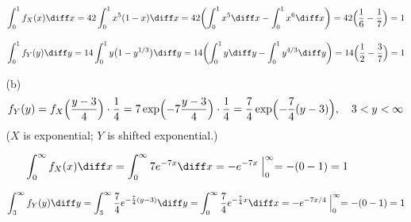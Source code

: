 \documentclass[12pt]{article}
\begin{document}
\begin{enumerate}
\begin{enumerate}
\[
\int_0^1 f_X(x)\diff x
= 42\int_0^1 x^5(1-x) \diff x
= 42\biggl(\int_0^1 x^5\diff x - \int_0^1 x^6\diff x\biggr)
= 42\Bigl(\frac{1}{6} - \frac{1}{7}\Bigr)
= 1
\]

\[
\int_0^1 f_Y(y) \diff y
= 14 \int_0^1 y\bigl(1 - y^{1/3}\bigr) \diff y
= 14\biggl(\int_0^1 y\diff y - \int_0^1 y^{4/3}\diff y\biggr)
= 14\Bigl(\frac{1}{2} - \frac{3}{7}\Bigr)
= 1
\]


\item[(b)]
\[
f_Y(y)
= f_X\Bigl(\frac{y - 3}{4}\Bigr) \cdot \frac{1}{4}
= 7\exp\Bigl(-7\frac{y-3}{4}\Bigr) \cdot \frac{1}{4}
= \frac{7}{4} \exp\Bigl(-\frac{7}{4}(y-3)\Bigr)
,
\quad
3 < y < \infty
\]
($X$ is exponential; $Y$ is shifted exponential.)

\[
\int_0^\infty f_X(x)\diff x
= \int_0^\infty 7 e^{-7x}\diff x
= -e^{-7x}\Bigm|_0^\infty
= -(0 - 1)
= 1
\]

\[
\int_3^\infty f_Y(y)\diff y
= \int_3^\infty \frac{7}{4} e^{-\frac{7}{4}(y-3)} \diff y
= \int_0^\infty \frac{7}{4} e^{-\frac{7}{4}x} \diff x
= -e^{-7x/4}\Bigm|_0^\infty
= -(0 - 1)
= 1
\]

\end{enumerate}

\end{enumerate}
\end{document}
